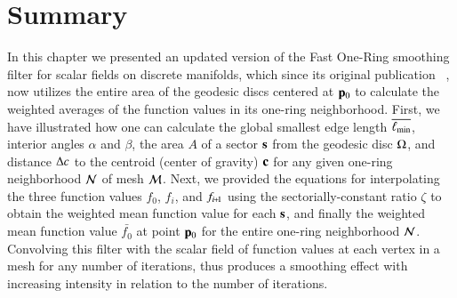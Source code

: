 \section{Summary}
\label{ch4sS}
In this chapter we presented an updated version of the Fast One-Ring smoothing filter for scalar fields on discrete manifolds, which since its original publication ~\cite[s.~3.2]{Mara17}, now utilizes the entire area of the geodesic discs centered at $\mathbf{p}_0$ to calculate the weighted averages of the function values in its one-ring neighborhood. First, we have illustrated how one can calculate the global smallest edge length $\overline{\ell_\text{min}}$, interior angles $\alpha$ and $\beta$, the area $A$ of a sector $\mathbf{s}$ from the geodesic disc $\Omega$, and distance $\Delta c$ to the centroid (center of gravity) $\mathbf{c}$ for any given one-ring neighborhood $\mathcal{N}$ of mesh $\mathcal{M}$. Next, we provided the equations for interpolating the three function values $f_0$, $f_i$, and $f_{\sipo}$ using the sectorially-constant ratio $\zeta$ to obtain the weighted mean function value for each $\mathbf{s}$, and finally the weighted mean function value $\bar{f_0}$ at point ${\mathbf{p}_0}$ for the entire one-ring neighborhood $\mathcal{N}$. Convolving this filter with the scalar field of function values at each vertex in a mesh for any number of iterations, thus produces a smoothing effect with increasing intensity in relation to the number of iterations.
